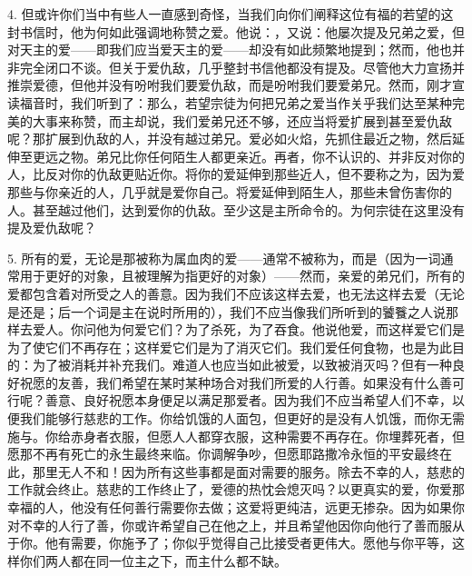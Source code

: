 4. 但或许你们当中有些人一直感到奇怪，当我们向你们阐释这位有福的若望的这封书信时，他为何如此强调地称赞之爱。他说：，又说：他屡次提及兄弟之爱，但对天主的爱——即我们应当爱天主的爱——却没有如此频繁地提到；然而，他也并非完全闭口不谈。但关于爱仇敌，几乎整封书信他都没有提及。尽管他大力宣扬并推崇爱德，但他并没有吩咐我们要爱仇敌，而是吩咐我们要爱弟兄。然而，刚才宣读福音时，我们听到了：那么，若望宗徒为何把兄弟之爱当作关乎我们达至某种完美的大事来称赞，而主却说，我们爱弟兄还不够，还应当将爱扩展到甚至爱仇敌呢？那扩展到仇敌的人，并没有越过弟兄。爱必如火焰，先抓住最近之物，然后延伸至更远之物。弟兄比你任何陌生人都更亲近。再者，你不认识的、并非反对你的人，比反对你的仇敌更贴近你。将你的爱延伸到那些近人，但不要称之为，因为爱那些与你亲近的人，几乎就是爱你自己。将爱延伸到陌生人，那些未曾伤害你的人。甚至越过他们，达到爱你的仇敌。至少这是主所命令的。为何宗徒在这里没有提及爱仇敌呢？\par

5. 所有的爱，无论是那被称为属血肉的爱——通常不被称为，而是（因为一词通常用于更好的对象，且被理解为指更好的对象）——然而，亲爱的弟兄们，所有的爱都包含着对所受之人的善意。因为我们不应该这样去爱，也无法这样去爱（无论是还是；后一个词是主在说时所用的），我们不应当像我们所听到的饕餮之人说那样去爱人。你问他为何爱它们？为了杀死，为了吞食。他说他爱，而这样爱它们是为了使它们不再存在；这样爱它们是为了消灭它们。我们爱任何食物，也是为此目的：为了被消耗并补充我们。难道人也应当如此被爱，以致被消灭吗？但有一种良好祝愿的友善，我们希望在某时某种场合对我们所爱的人行善。如果没有什么善可行呢？善意、良好祝愿本身便足以满足那爱者。因为我们不应当希望人们不幸，以便我们能够行慈悲的工作。你给饥饿的人面包，但更好的是没有人饥饿，而你无需施与。你给赤身者衣服，但愿人人都穿衣服，这种需要不再存在。你埋葬死者，但愿那不再有死亡的永生最终来临。你调解争吵，但愿耶路撒冷永恒的平安最终在此，那里无人不和！因为所有这些事都是面对需要的服务。除去不幸的人，慈悲的工作就会终止。慈悲的工作终止了，爱德的热忱会熄灭吗？以更真实的爱，你爱那幸福的人，他没有任何善行需要你去做；这爱将更纯洁，远更无掺杂。因为如果你对不幸的人行了善，你或许希望自己在他之上，并且希望他因你向他行了善而服从于你。他有需要，你施予了；你似乎觉得自己比接受者更伟大。愿他与你平等，这样你们两人都在同一位主之下，而主什么都不缺。\par

